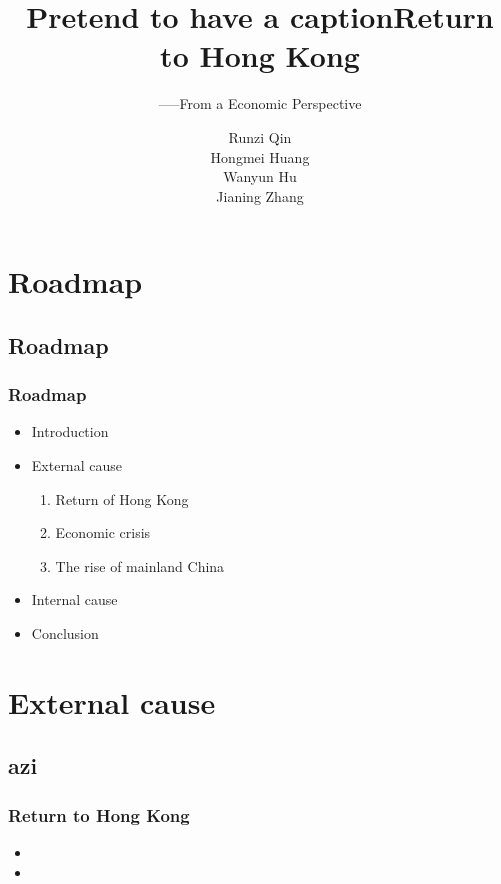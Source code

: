\documentclass[slidestop,uncompress,mathsans, 12pt]{beamer}
\begin{document}
\begin{frame}
\title{Pretend to have a caption}
\subtitle{-----From a Economic Perspective}
\author{Runzi Qin\\   Hongmei Huang\\   Wanyun Hu\\ Jianing Zhang}
\titlepage
\end{frame}

\section{Roadmap}
\subsection{Roadmap}
\begin{frame}
\frametitle{Roadmap}
\begin{itemize}
\item Introduction
\item External cause
\begin{enumerate}
\item  Return of Hong Kong
\item  Economic crisis
\item  The rise of mainland China
\end{enumerate}
\item Internal cause
\item  Conclusion
\end{itemize}
\end{frame}
\section{External cause}
\subsection{azi}
\begin{frame}
\title{Return to Hong Kong}
\date{}
\titlepage
\end{frame}
\begin{frame}
\frametitle{Return to Hong Kong}
\begin{itemize}
\item<2-> 
\bigskip
\item<2-> 
\end{itemize}
\end{frame}
\end{document}
